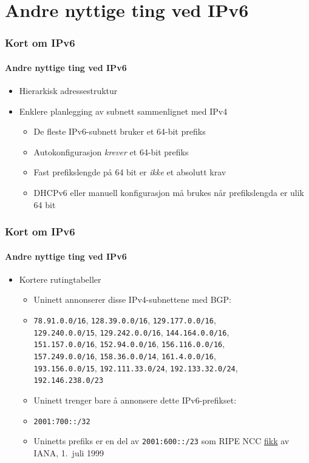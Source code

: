 \section{Andre nyttige ting ved IPv6}
\begin{frame}
  \frametitle{Kort om IPv6}
  \framesubtitle{Andre nyttige ting ved IPv6}
  \begin{itemize}
  \item Hierarkisk adressestruktur
  \item Enklere planlegging av subnett sammenlignet med IPv4
    \begin{itemize}
    \item De fleste IPv6-subnett bruker et 64-bit prefiks
    \item Autokonfigurasjon \textit{krever\/} et 64-bit prefiks
    \item Fast prefikslengde på 64 bit er \textit{ikke\/} et absolutt
      krav
    \item DHCPv6 eller manuell konfigurasjon må brukes når
      prefikslengda er ulik 64 bit
    \end{itemize}
  \end{itemize}
\end{frame}

\begin{frame}
  \frametitle{Kort om IPv6}
  \framesubtitle{Andre nyttige ting ved IPv6}
  \begin{itemize}
  \item Kortere rutingtabeller
    \begin{itemize}
    \item Uninett annonserer disse IPv4-subnettene med BGP:
    \item \texttt{78.91.0.0/16}, \hfill\alert<2>{\texttt{128.39.0.0/16}}, \hfill\texttt{129.177.0.0/16},\\
      \texttt{129.240.0.0/15}, \hfill\texttt{129.242.0.0/16}, \hfill\texttt{144.164.0.0/16},\\
      \texttt{151.157.0.0/16}, \hfill\texttt{152.94.0.0/16}, \hfill\texttt{156.116.0.0/16},\\
      \texttt{157.249.0.0/16}, \hfill\texttt{158.36.0.0/14}, \hfill\texttt{161.4.0.0/16},\\
      \texttt{193.156.0.0/15}, \hfill\texttt{192.111.33.0/24}, \hfill\texttt{192.133.32.0/24},\\
      \hfill\texttt{192.146.238.0/23}\hfill\null
    \item Uninett trenger bare å annonsere dette IPv6-prefikset:
    \item \texttt{2001:700::/32}
    \item Uninetts prefiks er en del av \texttt{2001:600::/23} som
      RIPE NCC
      \href{http://www.iana.org/assignments/ipv6-unicast-address-assignments/ipv6-unicast-address-assignments.xhtml}{fikk}
      av IANA, 1.~juli 1999
    \end{itemize}
  \end{itemize}
\end{frame}

